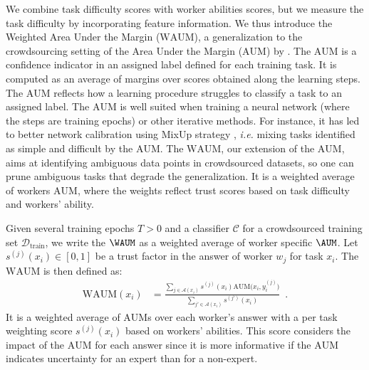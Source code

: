 We combine task difficulty scores with worker abilities scores, but we measure the task difficulty by incorporating feature information.
We thus introduce the Weighted Area Under the Margin ($\mathrm{WAUM}$), a generalization to the crowdsourcing setting of the Area Under the Margin ($\mathrm{AUM}$) by \citep{pleiss_identifying_2020}.
The $\mathrm{AUM}$ is a confidence indicator in an assigned label defined for each training task.
It is computed as an average of margins over scores obtained along the learning steps.
The $\mathrm{AUM}$ reflects how a learning procedure struggles to classify a task to an assigned label.
The $\mathrm{AUM}$ is well suited when training a neural network (where the steps are training epochs) or other iterative methods.
For instance, it has led to better network calibration \citep{park2022calibration} using MixUp strategy \citep{zhang2017mixup}, \emph{i.e.} mixing tasks identified as simple and difficult by the $\mathrm{AUM}$.
The $\mathrm{WAUM}$, our extension of the $\mathrm{AUM}$, aims at identifying ambiguous data points in crowdsourced datasets, so one can prune ambiguous tasks that degrade the generalization.
It is a weighted average of workers $\mathrm{AUM}$, where the weights reflect trust scores based on task difficulty and workers' ability.

Given several training epochs $T>0$ and a classifier $\mathcal{C}$ for a crowdsourced training set $\mathcal{D}_\text{train}$, we write the $\WAUM$ as a weighted average of worker specific $\AUM$.
Let $s^{(j)}(x_i)\in [0,1]$ be a trust factor in the answer of worker $w_j$ for task $x_i$.
The $\mathrm{WAUM}$ is then defined as:
\begin{align}
    \label{eq:WAUM}
    \mathrm{WAUM}(x_i)
     &
    = \tfrac{
    \displaystyle \sum_{j\in\mathcal{A}(x_i)}  \!\!\!
    s^{(j)}(x_i) \mathrm{AUM}\big(x_i, y_i^{(j)}\big)
    }
    {\displaystyle\sum_{j'\in\mathcal{A}(x_i)}
    s^{(j')}(x_i)}
    \enspace.
\end{align}
It is a weighted average of $\mathrm{AUM}$s over each worker's answer with a per task weighting score $s^{(j)}(x_i)$ based on workers' abilities.
This score considers the impact of the $\mathrm{AUM}$ for each answer since it is more informative if the $\mathrm{AUM}$ indicates uncertainty for an expert than for a non-expert.



